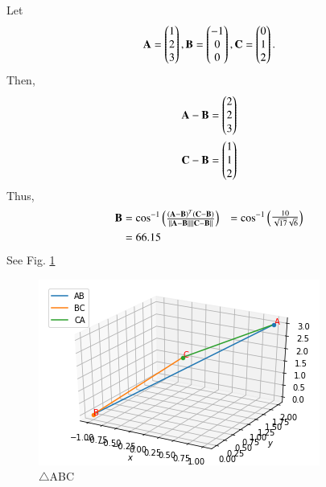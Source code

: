 Let
\begin{align}
\mathbf{A} = \begin{pmatrix}1 \\ 2 \\ 3\end{pmatrix} , 
\mathbf{B} = \begin{pmatrix}-1 \\ 0 \\0\end{pmatrix} , 
\mathbf{C} = \begin{pmatrix}0 \\ 1 \\ 2\end{pmatrix}.
\end{align}
Then, 
\begin{align}
\mathbf{A} - \mathbf{B} = \begin{pmatrix}2 \\ 2 \\  3\end{pmatrix} 
\\
\mathbf{C} - \mathbf{B} = \begin{pmatrix}1 \\ 1 \\ 2\end{pmatrix}
\end{align}
Thus, 
\begin{align}
\mathbf{B} &= \cos^{-1}\begin{pmatrix}{\frac{(\mathbf{A-B})^T\mathbf{(C-B)}}{\left\lVert\mathbf{A-B}\right\rVert\left\lVert\mathbf{C-B}\right\rVert}}\end{pmatrix}
&= \cos^{-1}\begin{pmatrix}\frac{10}{\sqrt{17}\sqrt{6}}\end{pmatrix}
\\
& = 66.15
\end{align}
See Fig. \ref{vectors/2/5/fig: triangle ABC}
\begin{figure}[!ht]
\centering
\includegraphics[width=\columnwidth]{solutions/su2021/2/5/download (4).png}
\caption{$\triangle$ABC}
\label{vectors/2/5/fig: triangle ABC}	
\end{figure}
